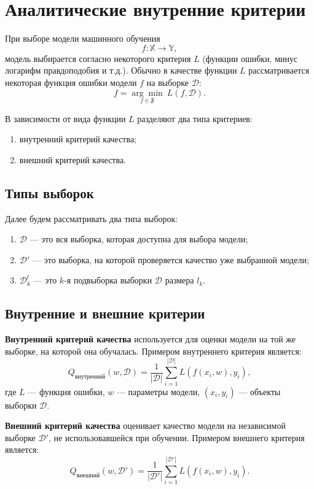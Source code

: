 \section*{Аналитические внутренние критерии}

При выборе модели машинного обучения
\[
f : \mathbb{X} \to \mathbb{Y},
\]
модель выбирается согласно некоторого критерия $L$ (функции ошибки, минус логарифм правдоподобия и т.д.). Обычно в качестве функции $L$ рассматривается некоторая функция ошибки модели $f$ на выборке $\mathcal{D}$:
\[
f = \underset{f \in \mathfrak{F}}{\arg\min} \ L(f, \mathcal{D}).
\]

В зависимости от вида функции $L$ разделяют два типа критериев:
\begin{enumerate}
    \item внутренний критерий качества;
    \item внешний критерий качества.
\end{enumerate}

\subsection*{Типы выборок}
Далее будем рассматривать два типа выборок:
\begin{enumerate}
    \item $\mathcal{D}$ --- это вся выборка, которая доступна для выбора модели;
    \item $\mathcal{D}'$ --- это выборка, на которой проверяется качество уже выбранной модели;
    \item $\mathcal{D}^l_k$ --- это $k$-я подвыборка выборки $\mathcal{D}$ размера $l_k$.
\end{enumerate}

\subsection*{Внутренние и внешние критерии}
\textbf{Внутренний критерий качества} используется для оценки модели на той же выборке, на которой она обучалась. Примером внутреннего критерия является:
\[
Q_{\text{внутренний}}(w, \mathcal{D}) = \frac{1}{|\mathcal{D}|} \sum_{i=1}^{|\mathcal{D}|} L(f(x_i, w), y_i),
\]
где $L$ --- функция ошибки, $w$ --- параметры модели, $(x_i, y_i)$ --- объекты выборки $\mathcal{D}$. 

\textbf{Внешний критерий качества} оценивает качество модели на независимой выборке $\mathcal{D}'$, не использовавшейся при обучении. Примером внешнего критерия является:
\[
Q_{\text{внешний}}(w, \mathcal{D}') = \frac{1}{|\mathcal{D}'|} \sum_{i=1}^{|\mathcal{D}'|} L(f(x_i, w), y_i).
\]

